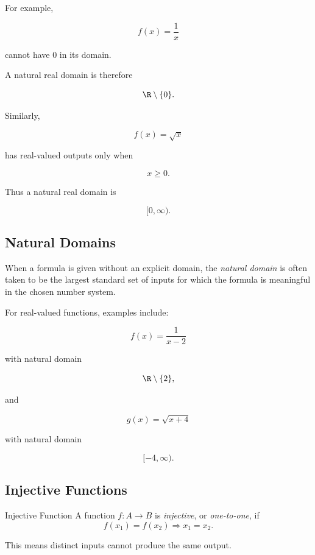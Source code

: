 For example,

\[ f(x)=\frac1x \]

cannot have \(0\) in its domain.

A natural real domain is therefore

\[ \R\setminus\{0\}. \]

Similarly,

\[ f(x)=\sqrt x \]

has real-valued outputs only when

\[ x\geq0. \]

Thus a natural real domain is

\[ [0,\infty). \]

\subsection{Natural Domains}
\label{subsec:natural-domains}

When a formula is given without an explicit domain, the \emph{natural domain}
is often taken to be the largest standard set of inputs for which the formula
is meaningful in the chosen number system.

For real-valued functions, examples include:

\[ f(x)=\frac1{x-2} \]

with natural domain

\[ \R\setminus\{2\}, \]

and

\[ g(x)=\sqrt{x+4} \]

with natural domain

\[ [-4,\infty). \]

\subsection{Injective Functions}
\label{subsec:injective-functions}

\begin{definitionbox}{Injective Function}
A function \(f:A\to B\) is \emph{injective}, or \emph{one-to-one}, if
\[ f(x_1)=f(x_2)\Longrightarrow x_1=x_2. \]
\end{definitionbox}

This means distinct inputs cannot produce the same output.

